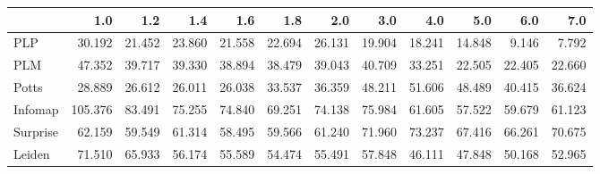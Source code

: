\begin{tabular}{lrrrrrrrrrrr}
\toprule
{} &     1.0 &    1.2 &    1.4 &    1.6 &    1.8 &    2.0 &    3.0 &    4.0 &    5.0 &    6.0 &    7.0 \\
\midrule
PLP      &  30.192 & 21.452 & 23.860 & 21.558 & 22.694 & 26.131 & 19.904 & 18.241 & 14.848 &  9.146 &  7.792 \\
PLM      &  47.352 & 39.717 & 39.330 & 38.894 & 38.479 & 39.043 & 40.709 & 33.251 & 22.505 & 22.405 & 22.660 \\
Potts    &  28.889 & 26.612 & 26.011 & 26.038 & 33.537 & 36.359 & 48.211 & 51.606 & 48.489 & 40.415 & 36.624 \\
Infomap  & 105.376 & 83.491 & 75.255 & 74.840 & 69.251 & 74.138 & 75.984 & 61.605 & 57.522 & 59.679 & 61.123 \\
Surprise &  62.159 & 59.549 & 61.314 & 58.495 & 59.566 & 61.240 & 71.960 & 73.237 & 67.416 & 66.261 & 70.675 \\
Leiden   &  71.510 & 65.933 & 56.174 & 55.589 & 54.474 & 55.491 & 57.848 & 46.111 & 47.848 & 50.168 & 52.965 \\
\bottomrule
\end{tabular}
